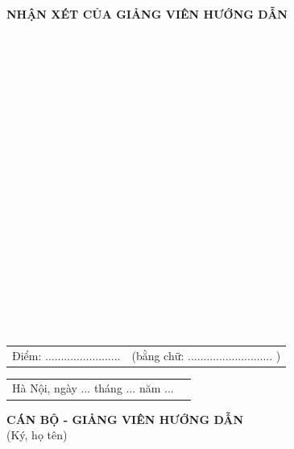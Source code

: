 \documentclass[../BTL.tex]{subfiles}
\begin{document}
\thispagestyle{empty}

\begin{center}
\textbf{NHẬN XÉT CỦA GIẢNG VIÊN HƯỚNG DẪN}
\end{center}

\vspace{0.5cm}

\begin{center}
\dotfill\\
\dotfill\\
\dotfill\\
\dotfill\\
\dotfill\\
\dotfill\\
\dotfill\\
\dotfill\\
\dotfill\\
\dotfill\\
\dotfill\\
\dotfill\\
\dotfill\\
\dotfill\\
\dotfill\\
\dotfill\\
\dotfill\\
\dotfill\\
\dotfill\\
\end{center}

\vspace{0.5cm}

\begin{tabular}{@{}l l@{}}
Điểm: ........................ & (bằng chữ: ........................... ) \\
\end{tabular}

\vspace{1cm}

\begin{tabular}{@{}l r@{}}
Hà Nội, ngày ... tháng ... năm ... & \\
\end{tabular}

\vspace{1cm}

\begin{center}
\textbf{CÁN BỘ - GIẢNG VIÊN HƯỚNG DẪN}\\
(Ký, họ tên)
\end{center}
\end{document}
